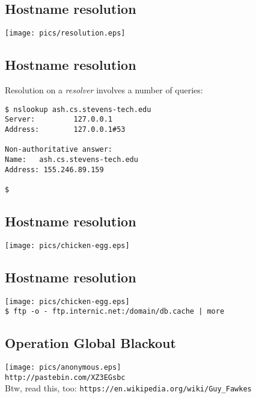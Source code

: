 \documentclass[xga]{xdvislides}
\begin{document}
\subsection{Hostname resolution}
\vspace*{\fill}
\begin{center}
	\texttt{[image: pics/resolution.eps]}
\end{center}
\vspace*{\fill}


\subsection{Hostname resolution}
Resolution on a {\em resolver} involves a number of queries:
\begin{verbatim}
$ nslookup ash.cs.stevens-tech.edu
Server:         127.0.0.1
Address:        127.0.0.1#53

Non-authoritative answer:
Name:   ash.cs.stevens-tech.edu
Address: 155.246.89.159

$
\end{verbatim}

\subsection{Hostname resolution}
\vspace*{\fill}
\begin{center}
	\texttt{[image: pics/chicken-egg.eps]} \\
	\vspace*{\fill}
\end{center}

\subsection{Hostname resolution}
\vspace*{\fill}
\begin{center}
	\texttt{[image: pics/chicken-egg.eps]} \\
	\addvspace{.2in}
	\verb+$ ftp -o - ftp.internic.net:/domain/db.cache | more+
	\vspace*{\fill}
\end{center}

\subsection{Operation Global Blackout}
\vspace*{\fill}
\begin{center}
	\texttt{[image: pics/anonymous.eps]} \\
	\addvspace{.2in}
	\verb+http://pastebin.com/XZ3EGsbc+ \\
	\addvspace{.1in}
	\small
	Btw, read this, too: \verb+https://en.wikipedia.org/wiki/Guy_Fawkes+
\end{center}
\vspace*{\fill}
\end{document}
